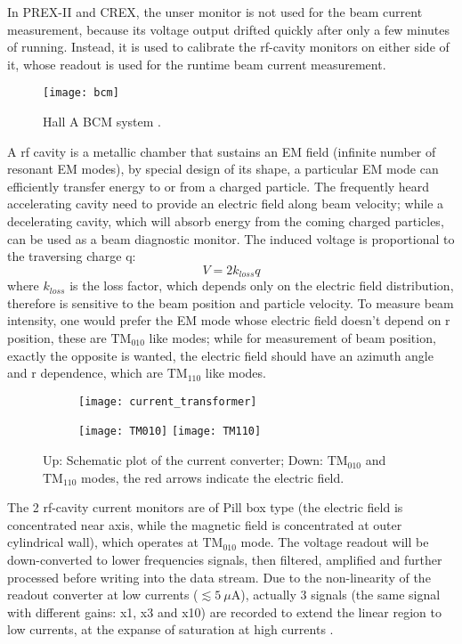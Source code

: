In PREX-II and CREX, the unser monitor is not used for the beam current measurement,
because its voltage output drifted quickly after only a few minutes of running.
Instead, it is used to calibrate the rf-cavity monitors on either side of it,
whose readout is used for the runtime beam current measurement.
\begin{figure}[!h]
    \centering
    \texttt{[image: bcm]}
    \caption{Hall A BCM system \cite{987367}.}
    \label{fig:BCMs}
\end{figure}

A rf cavity is a metallic chamber that sustains an EM field 
(infinite number of resonant EM modes), by special design of its shape, a particular
EM mode can efficiently transfer energy to or from a charged particle. The 
frequently heard accelerating cavity need to provide an electric field along
beam velocity; while a decelerating cavity, which will absorb energy
from the coming charged particles, can be used as a beam diagnostic monitor.
The induced voltage is proportional to the traversing charge q:
\begin{equation}
    V = 2k_{loss} q
\end{equation}
where $k_{loss}$ is the loss factor, which depends only on the electric field
distribution, therefore is sensitive to the beam position and particle velocity.
To measure beam intensity, one would prefer the EM mode whose electric field
doesn't depend on r position, these are $\text{TM}_{\text{010}}$ like modes;
while for measurement of beam position, exactly the opposite is wanted, the
electric field should have an azimuth angle and r dependence, which are $\text{TM}_{\text{110}}$
like modes.
\begin{figure}[!h]
    \centering
    \begin{subfigure}[c]{0.5\textwidth}
	\texttt{[image: current\_transformer]}
    \end{subfigure}
    \begin{subfigure}[c]{0.55\textwidth}
	\texttt{[image: TM010]}
	\texttt{[image: TM110]}
    \end{subfigure}
    \caption{Up: Schematic plot of the current converter; 
    Down: $\text{TM}_{010}$ and $\text{TM}_{110}$ modes, the red arrows indicate the electric field.}
\end{figure}

The 2 rf-cavity current monitors are of Pill box type (the electric field is
concentrated near axis, while the magnetic field is concentrated at outer
cylindrical wall), which operates at $\text{TM}_\text{010}$ mode. The voltage 
readout will be down-converted to lower frequencies signals, then filtered, 
amplified and further processed before writing into the data stream. Due to
the non-linearity of the readout converter at low currents ($\lesssim 5\ \mu$A), 
actually 3 signals (the same signal with different gains: x1, x3 and x10) are
recorded to extend the linear region to low currents, at the expanse of saturation
at high currents \cite{halla_manual}.

